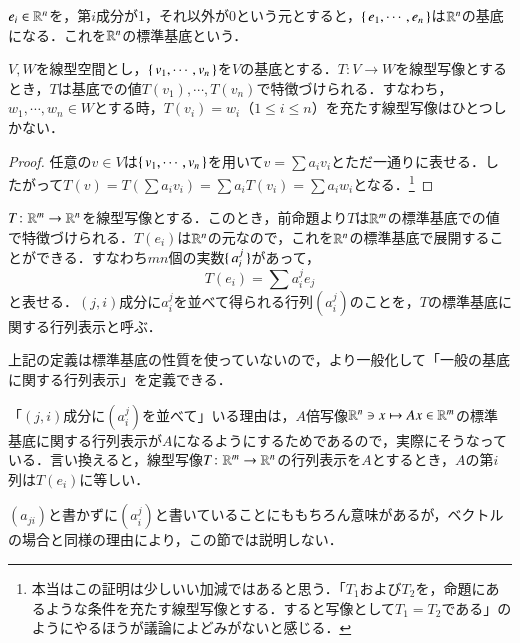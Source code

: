 \begin{que}
$e_i \in \mathbb{R}^n$を，第$i$成分が1，それ以外が0という元とすると，$\set{e_1, \cdots, e_n}$は$\mathbb{R}^n$の基底になる．これを$\mathbb{R}^n$の標準基底という．
\end{que}

\begin{prop}
$V,W$を線型空間とし，$\set{v_1, \cdots, v_n}$を$V$の基底とする．$T \colon V \to W$を線型写像とするとき，$T$は基底での値$T(v_1),\cdots, T(v_n)$で特徴づけられる．すなわち，$w_1,\cdots, w_n \in W$とする時，$T(v_i) = w_i$（$1 \leq i \leq n$）を充たす線型写像はひとつしかない．
\end{prop}

\begin{proof}
任意の$v \in V$は$\set{v_1, \cdots, v_n}$を用いて$v = \sum a_i v_i$とただ一通りに表せる．したがって$T(v) = T(\sum a_i v_i) = \sum a_i T(v_i) = \sum a_i w_i$となる．\footnote{本当はこの証明は少しいい加減ではあると思う．「$T_1$および$T_2$を，命題にあるような条件を充たす線型写像とする．すると写像として$T_1=T_2$である」のようにやるほうが議論によどみがないと感じる．}
\end{proof}

\begin{defi}
$T \colon \mathbb{R}^m \to \mathbb{R}^n$を線型写像とする．このとき，前命題より$T$は$\mathbb{R}^m$の標準基底での値で特徴づけられる．$T(e_i)$は$\mathbb{R}^n$の元なので，これを$\mathbb{R}^n$の標準基底で展開することができる．すなわち$mn$個の実数$\set{a_i^j}$があって，
\begin{equation}
T(e_i) = \sum a_{i}^j e_j
\end{equation}
と表せる．$(j,i)$成分に$a_{i}^j$を並べて得られる行列$\left(a_{i}^j\right)$のことを，$T$の標準基底に関する行列表示と呼ぶ．
\end{defi}

\begin{que}
上記の定義は標準基底の性質を使っていないので，より一般化して「一般の基底に関する行列表示」を定義できる．
\end{que}

\begin{que}
「$(j,i)$成分に$\left(a^j_i\right)$を並べて」いる理由は，$A$倍写像$\mathbb{R}^n \ni x \mapsto Ax \in \mathbb{R}^m$の標準基底に関する行列表示が$A$になるようにするためであるので，実際にそうなっている．言い換えると，線型写像$T \colon \mathbb{R}^m \to \mathbb{R}^n$の行列表示を$A$とするとき，$A$の第$i$列は$T(e_i)$に等しい．
\end{que}

\begin{dig}
$\left(a_{ji}\right)$と書かずに$\left(a^j_i\right)$と書いていることにももちろん意味があるが，ベクトルの場合と同様の理由により，この節では説明しない．
\end{dig}

